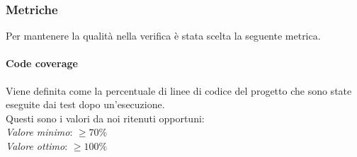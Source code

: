 \subsubsection{Metriche}
Per mantenere la qualità nella verifica è stata scelta la seguente metrica.
\paragraph{Code coverage}
Viene definita come la percentuale di linee di codice del progetto che sono state eseguite dai test dopo un'esecuzione.\\
Questi sono i valori da noi ritenuti opportuni:\\
\textit{Valore minimo}: $ \ge 70\% $\\
\textit{Valore ottimo}: $ \ge 100\% $\\